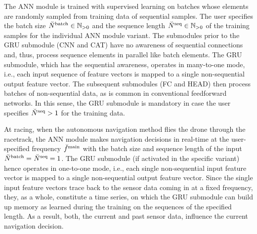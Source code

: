 The ANN module is trained with supervised learning on
batches whose elements are randomly sampled from training data
of sequential samples.
The user specifies
the batch size 
$
    {}_{}^{} \breve{N}^{\text{batch}}_{} \in \mathbb{N}_{>0}
$ 
and the sequence length 
$
    {}_{}^{} \breve{N}^{\text{seq}}_{} \in \mathbb{N}_{>0}
$
of the training samples 
for the individual ANN module variant.
The submodules prior to the GRU submodule (CNN and CAT)
have no awareness of sequential connections 
and, thus, process sequence elements in parallel like batch elements.
The GRU submodule,
which has the sequential awareness,
operates in many-to-one mode, i.e.,
each input sequence of feature vectors is mapped to a 
single non-sequential output feature vector.
The subsequent submodules (FC and HEAD)
then process batches of non-sequential data, 
as is common in conventional feedforward networks.
In this sense,
the GRU submodule is mandatory in case the user specifies
${}_{}^{} \breve{N}^{\text{seq}}_{} > 1$ for the training data.

At racing,
when the autonomous navigation method flies the drone through the racetrack,
the ANN module makes navigation decisions 
in real-time at the user-specified frequency
${}_{}^{} \breve{f}^{\text{main}}_{}$ with the batch size and sequence length 
of the input
${}_{}^{} \breve{N}^{\text{batch}}_{} = {}_{}^{} \breve{N}^{\text{seq}}_{} =1$.
The GRU submodule (if activated in the specific variant) 
hence operates in one-to-one mode,
i.e., 
each single non-sequential input feature vector
is mapped to a single non-sequential output feature vector.
Since the single input feature vectors 
trace back to the sensor data coming in at a fixed frequency,
they, as a whole, constitute a time series,
on which the GRU submodule can build up memory
as learned during the training on the sequences of the specified length.
As a result, both, the current and past sensor data, 
influence the current navigation decision.





